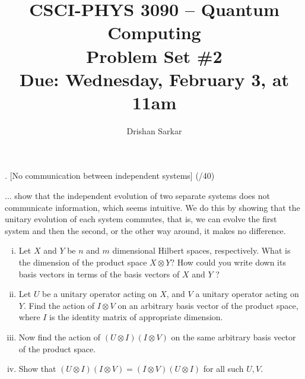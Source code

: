 \documentclass[11pt]{article}
\begin{document}
\author{Drishan Sarkar}
\title{CSCI-PHYS 3090 -- Quantum Computing\\ Problem Set \#2 \\  Due: Wednesday, February 3, at 11am}
\maketitle

 
 . [No communication between independent systems] (/40)

... show that the independent evolution of two separate systems
does not communicate information, which seems intuitive. We do this by showing that the
unitary evolution of each system commutes, that is, we can evolve the first system and then
the second, or the other way around, it makes no difference.
\begin{enumerate}[(i)]
\item Let $X$ and $Y$ be $n$ and $m$ dimensional Hilbert spaces, respectively. What is the
dimension of the product space $X \otimes Y$? How could you write down its basis vectors
in terms of the basis vectors of $X$ and $Y$ ?\\
\item Let $U$ be a unitary operator acting on $X$, and $V$ a unitary operator acting on $Y$. Find
the action of $I \otimes V$ on an arbitrary basis vector of the product space, where $I$ is the
identity matrix of appropriate dimension.\\
\item Now find the action of $(U\otimes I)(I\otimes V)$ on the same arbitrary basis vector of the product
space.
\item Show that $(U\otimes I)(I\otimes V) = (I\otimes V)(U\otimes I)$ for all such $U,V$.
\end{enumerate}
\end{document}
